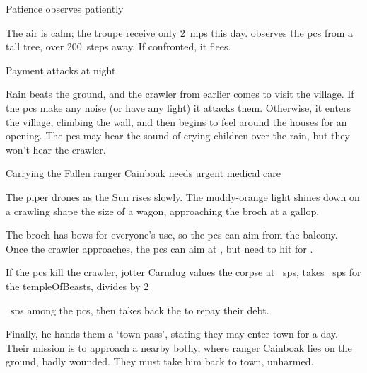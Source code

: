 \documentclass[10pt,twoside]{book}
\begin{document}




\chitincrawler

{Patience}%
{ observes patiently}%

The air is calm; the troupe receive only 2~\glspl{mp} this day.
 observes the \glspl{pc} from a tall tree, over 200~\glspl{step} away.
If confronted, it flees.

{Payment}%
{ attacks at night}%

Rain beats the ground, and the \gls{crawler} from earlier comes to visit the \gls{village}.
If the \glspl{pc} make any noise (or have any light) it attacks them.
Otherwise, it enters the \gls{village}, climbing the wall, and then begins to feel around the houses for an opening.
The \glspl{pc} may hear the sound of crying children over the rain, but they won't hear the \gls{crawler}.


\chitincrawler
\setcounter{gold}{\value{xp}}

{Carrying the Fallen}%
{\Gls{ranger} Cainboak needs urgent medical care}%

The piper drones as the Sun rises slowly.
The muddy-orange light shines down on a crawling shape the size of a wagon, approaching the \gls{broch} at a gallop.

The \gls{broch} has \glspl{bow} for everyone's use, so the \glspl{pc} can aim from the balcony.
Once the \gls{crawler} approaches, the \glspl{pc} can aim at \tn[12], but need to hit \tn[17] for .

If the \glspl{pc} kill the \gls{crawler}, \gls{jotter} Carndug values the corpse at ~\glspl{sp}, takes
~\glspl{sp} for the \gls{templeOfBeasts}, divides
\divide\value{gold} by 2%
\addtocounter{gold}{0}%
~\glspl{sp} among the \glspl{pc}, then takes back the  to repay their debt.

Finally, he hands them a `town-pass', stating they may enter town for a day.
Their mission is to approach a nearby \gls{bothy}, where \gls{ranger} Cainboak lies on the ground, badly wounded.
They must take him back to town, unharmed.
\end{document}

